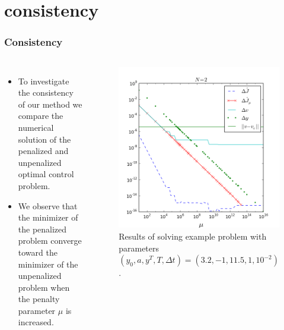 \documentclass[9pt]{beamer}
\begin{document}
\section{consistency}
\begin{frame}
\frametitle{Consistency}
\begin{columns}
\begin{itemize}
\item{To investigate the consistency of our method we compare the numerical solution of the penalized and unpenalized optimal control problem.}
\item{We observe that the minimizer of the penalized problem converge toward the minimizer of the unpenalized problem when the penalty parameter $\mu$ is increased.}
\end{itemize}
\begin{figure}[!h]
\centering
\includegraphics[scale=0.3]{con2.png}
\caption{Results of solving example problem with parameters $(y_0,a,y^T,T,\Delta t)=(3.2,-1,11.5,1,10^{-2})$. }
\end{figure}
\end{columns}
\end{frame}
\end{document}
